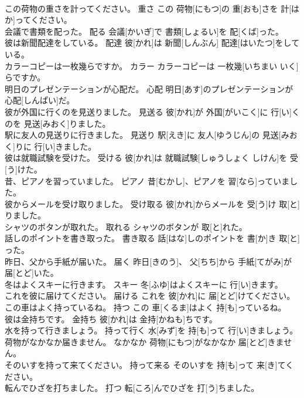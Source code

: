 \documentclass[8pt]{extreport}
\begin{document}
\begin{CJK}{UTF8}{min}
\\	この荷物の重さを計ってください。	重さ	この 荷物[にもつ]の 重[おも]さを 計[はか]ってください。	
\\	会議で書類を配った。	配る	会議[かいぎ]で 書類[しょるい]を 配[くば]った。	
\\	彼は新聞配達をしている。	配達	彼[かれ]は 新聞[しんぶん] 配達[はいたつ]をしている。	
\\	カラーコピーは一枚幾らですか。	カラー	カラーコピーは 一枚幾[いちまい いく]らですか。	
\\	明日のプレゼンテーションが心配だ。	心配	明日[あす]のプレゼンテーションが 心配[しんぱい]だ。	
\\	彼が外国に行くのを見送りました。	見送る	彼[かれ]が 外国[がいこく]に 行[い]くのを 見送[みおく]りました。	
\\	駅に友人の見送りに行きました。	見送り	駅[えき]に 友人[ゆうじん]の 見送[みおく]りに 行[い]きました。	
\\	彼は就職試験を受けた。	受ける	彼[かれ]は 就職試験[しゅうしょく しけん]を 受[う]けた。	
\\	昔、ピアノを習っていました。	ピアノ	昔[むかし]、ピアノを 習[なら]っていました。	
\\	彼からメールを受け取りました。	受け取る	彼[かれ]からメールを 受[う]け 取[と]りました。	
\\	シャツのボタンが取れた。	取れる	シャツのボタンが 取[と]れた。	
\\	話しのポイントを書き取った。	書き取る	話[はな]しのポイントを 書[か]き 取[と]った。	
\\	昨日、父から手紙が届いた。	届く	昨日[きのう]、 父[ちち]から 手紙[てがみ]が 届[とど]いた。	
\\	冬はよくスキーに行きます。	スキー	冬[ふゆ]はよくスキーに 行[い]きます。	
\\	これを彼に届けてください。	届ける	これを 彼[かれ]に 届[とど]けてください。	
\\	この車はよく持っているね。	持つ	この 車[くるま]はよく 持[も]っているね。	
\\	彼は金持ちです。	金持ち	彼[かれ]は 金持[かねも]ちです。	
\\	水を持って行きましょう。	持って行く	水[みず]を 持[も]って 行[い]きましょう。	
\\	荷物がなかなか届きません。	なかなか	荷物[にもつ]がなかなか 届[とど]きません。	
\\	そのいすを持って来てください。	持って来る	そのいすを 持[も]って 来[き]てください。	
\\	転んでひざを打ちました。	打つ	転[ころ]んでひざを 打[う]ちました。	

\end{CJK}
\end{document}

